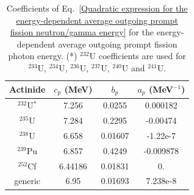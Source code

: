 \begin{list}{}
\begin{table}[ht]
\footnotesize
\begin{center}
\begin{tabular}{|c|c|c|c|} \hline
Actinide & $c_{p}$ (MeV)  & $b_{p}$ & $a_{p}$ (MeV$^{-1}$) \\ \hline
$^{232}$U$^{*}$ & 7.256 & 0.0255 & 0.000182 \\
$^{235}$U & 7.284 & 0.2295 & -0.00474 \\
$^{238}$U & 6.658 & 0.01607 & -1.22e-7 \\
$^{239}$Pu & 6.857 & 0.4249 & -0.009878 \\
$^{252}$Cf & 6.44186 & 0.01831 & 0. \\
generic & 6.95 & 0.01693 & 7.238e-8 \\ \hline
\end{tabular}
\end{center}
\caption{Coefficients of Eq.~\ref{Quadratic expression 
for the energy-dependent average outgoing prompt 
fission neutron/gamma energy} for the energy-dependent 
average outgoing prompt fission photon energy. (*) $^{232}$U 
coefficients are used for $^{233}$U, $^{234}$U, $^{236}$U, 
$^{237}$U, $^{240}$U and $^{241}$U.}
\label{Coefficients for prompt fission photons}
\end{table}
\end{list}

